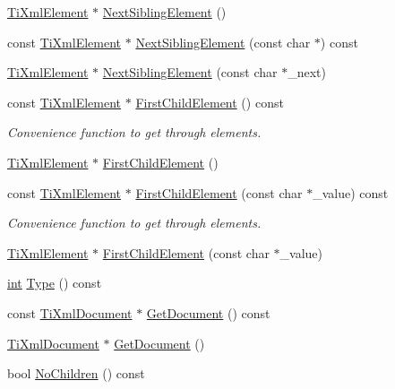 \begin{DoxyCompactItemize}
\item 
\hyperlink{class_ti_xml_element}{Ti\-Xml\-Element} $\ast$ \hyperlink{class_ti_xml_node_a1b211cb5034655a04358e0e2f6fc5010}{Next\-Sibling\-Element} ()
\item 
const \hyperlink{class_ti_xml_element}{Ti\-Xml\-Element} $\ast$ \hyperlink{class_ti_xml_node_a071ba77fd7ab79402fa84b7e9b8607b3}{Next\-Sibling\-Element} (const char $\ast$) const 
\item 
\hyperlink{class_ti_xml_element}{Ti\-Xml\-Element} $\ast$ \hyperlink{class_ti_xml_node_a6e1ac6b800e18049bc75e9f8e63a8e5f}{Next\-Sibling\-Element} (const char $\ast$\-\_\-next)
\item 
const \hyperlink{class_ti_xml_element}{Ti\-Xml\-Element} $\ast$ \hyperlink{class_ti_xml_node_af4fb652f6bd79ae0d5ce7d0f7d3c0fba}{First\-Child\-Element} () const 
\begin{DoxyCompactList}\small\item\em Convenience function to get through elements. \end{DoxyCompactList}\item 
\hyperlink{class_ti_xml_element}{Ti\-Xml\-Element} $\ast$ \hyperlink{class_ti_xml_node_aa0fecff1f3866ab33a8a25506e95db1d}{First\-Child\-Element} ()
\item 
const \hyperlink{class_ti_xml_element}{Ti\-Xml\-Element} $\ast$ \hyperlink{class_ti_xml_node_accda2c6b45c25bb5a6f9c3407a644e61}{First\-Child\-Element} (const char $\ast$\-\_\-value) const 
\begin{DoxyCompactList}\small\item\em Convenience function to get through elements. \end{DoxyCompactList}\item 
\hyperlink{class_ti_xml_element}{Ti\-Xml\-Element} $\ast$ \hyperlink{class_ti_xml_node_a6936ae323675071808ac4840379e57f5}{First\-Child\-Element} (const char $\ast$\-\_\-value)
\item 
\hyperlink{wglew_8h_a500a82aecba06f4550f6849b8099ca21}{int} \hyperlink{class_ti_xml_node_a57b99d5c97d67a42b9752f5210a1ba5e}{Type} () const 
\item 
const \hyperlink{class_ti_xml_document}{Ti\-Xml\-Document} $\ast$ \hyperlink{class_ti_xml_node_a80e397fa973cf5323e33b07154b024f3}{Get\-Document} () const 
\item 
\hyperlink{class_ti_xml_document}{Ti\-Xml\-Document} $\ast$ \hyperlink{class_ti_xml_node_a7b2372c0e7adfb32f5b6902fe49a39b2}{Get\-Document} ()
\item 
bool \hyperlink{class_ti_xml_node_aeed21ad30630ef6e7faf096127edc9f3}{No\-Children} () const 

\end{DoxyCompactItemize}

